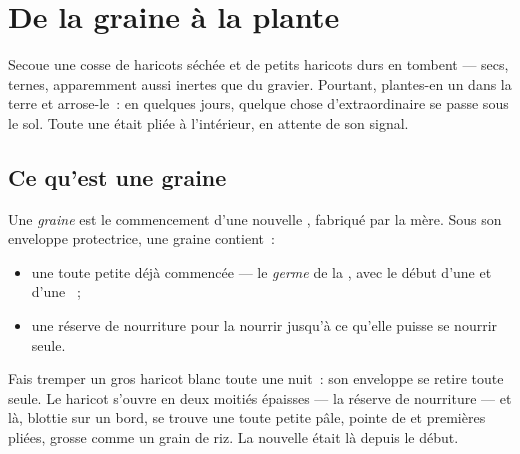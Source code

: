 \chapter{De la graine à la plante}\label{ch:g2:from-seed-to-plant}

Secoue une cosse de haricots séchée et de petits haricots durs en
tombent --- secs, ternes, apparemment aussi inertes que du gravier.
Pourtant, plantes-en un dans la terre et arrose-le~: en quelques
jours, quelque chose d'extraordinaire se passe sous le sol. Toute une
 était pliée à l'intérieur, en attente de son signal.

\section{Ce qu'est une graine}

\begin{definition}[Graine]\label{def:g2:from-seed-to-plant:seed}
Une \emph{graine} est le commencement d'une nouvelle
, fabriqué par la  mère. Sous son enveloppe protectrice,
une graine contient~:
\begin{itemize}
  \item une toute petite  déjà commencée --- le
        \emph{germe} de la , avec
        le début d'une  et d'une ~;
  \item une réserve de nourriture pour la nourrir jusqu'à ce
        qu'elle puisse se nourrir seule.
\end{itemize}
\end{definition}

\begin{example}\label{ex:g2:from-seed-to-plant:open}
Fais tremper un gros haricot blanc toute une nuit~: son enveloppe se
retire toute seule. Le haricot s'ouvre en deux moitiés épaisses ---
la réserve de nourriture --- et là, blottie sur un bord, se trouve
une toute petite  pâle, pointe de  et premières 
pliées, grosse comme un grain de riz. La nouvelle  était là
depuis le début.
\end{example}

